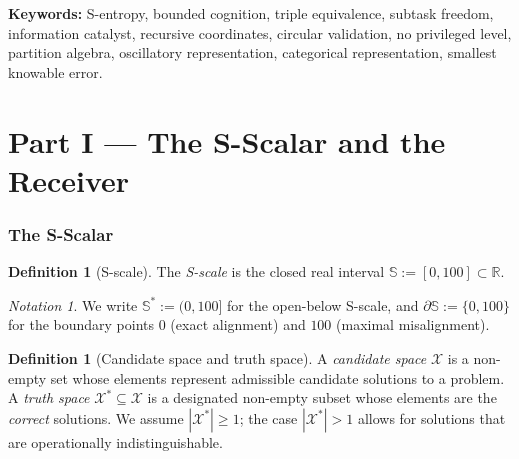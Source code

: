 \documentclass[11pt,a4paper]{article}
\theoremstyle{thmstyle}
\theoremstyle{thmstyle}
\theoremstyle{definition}
\newtheorem{definition}[theorem]{Definition}
\theoremstyle{remark}
\newtheorem{notation}[theorem]{Notation}
\newcommand{\Sscale}{\mathbb{S}}
\newcommand{\Real}{\mathbb{R}}
\newcommand{\Cands}{\mathcal{X}}
\newcommand{\Truth}{\mathcal{X}^{*}}
\begin{document}
\noindent\textbf{Keywords:} S-entropy, bounded cognition,
triple equivalence, subtask freedom, information catalyst,
recursive coordinates, circular validation, no privileged
level, partition algebra, oscillatory representation,
categorical representation, smallest knowable error.

\vspace{6pt}
\tableofcontents
\vspace{6pt}

\clearpage

\part*{Part I --- The S-Scalar and the Receiver}

\section{The S-Scalar}
\label{sec:s-scalar}

\begin{definition}[S-scale]\label{def:s-scale}
The \emph{S-scale} is the closed real interval
$\Sscale := [0, 100] \subset \Real$.
\end{definition}

\begin{notation}\label{not:s-scale}
We write $\Sscale^{*} := (0, 100]$ for the open-below
S-scale, and $\partial \Sscale := \{0, 100\}$ for the
boundary points $0$ (exact alignment) and $100$
(maximal misalignment).
\end{notation}

\begin{definition}[Candidate space and truth space]
\label{def:candidate-truth}
A \emph{candidate space} $\Cands$ is a non-empty set
whose elements represent admissible candidate solutions
to a problem.  A \emph{truth space} $\Truth \subseteq \Cands$
is a designated non-empty subset whose elements are the
\emph{correct} solutions. We assume $|\Truth| \geq 1$; the
case $|\Truth| > 1$ allows for solutions that are
operationally indistinguishable.
\end{definition}
\end{document}
